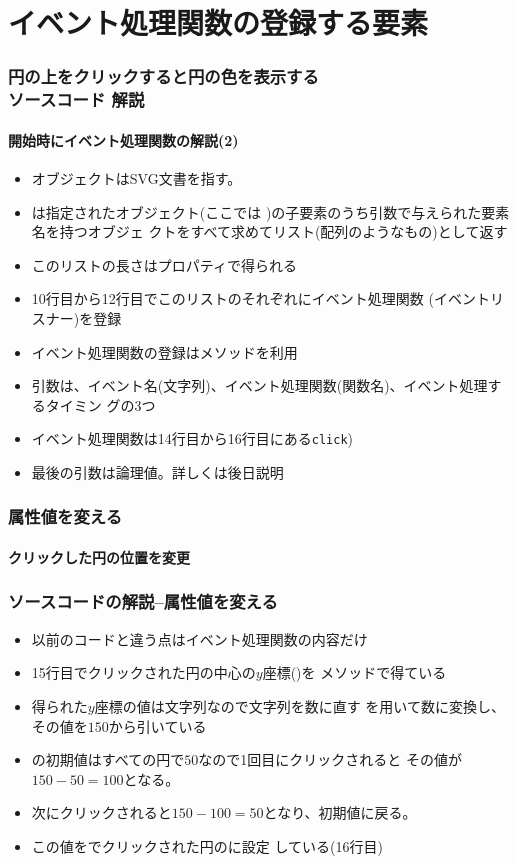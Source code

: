 \section{イベント処理関数の登録する要素}
\begin{frame}[containsverbatim]
 \frametitle{円の上をクリックすると円の色を表示する\\ソースコード
 解説}
  \framesubtitle{開始時にイベント処理関数の解説(2)}
\begin{itemize}
 \item {}オブジェクトはSVG文書を指す。
 \item {}は指定されたオブジェクト(ここでは
       )の子要素のうち引数で与えられた要素名を持つオブジェ
       クトをすべて求めてリスト(配列のようなもの)として返す
 \item このリストの長さはプロパティで得られる
 \item 10行目から12行目でこのリストのそれぞれにイベント処理関数
       (イベントリスナー)を登録
 \item イベント処理関数の登録はメソッドを利用
 \item 引数は、イベント名(文字列)、イベント処理関数(関数名)、イベント処理するタイミン
       グの3つ
 \item イベント処理関数は14行目から16行目にある\texttt{click})
 \item 最後の引数は論理値。詳しくは後日説明
\end{itemize}
\end{frame}
\begin{frame}[containsverbatim]
 \frametitle{属性値を変える}
 \framesubtitle{クリックした円の位置を変更}
\end{frame}
\begin{frame}[containsverbatim]
 \frametitle{ソースコードの解説--属性値を変える}
 \begin{itemize}
  \item 以前のコードと違う点はイベント処理関数の内容だけ
  \item 15行目でクリックされた円の中心の$y$座標()を
        メソッドで得ている
  \item 得られた$y$座標の値は文字列なので文字列を数に直す
        を用いて数に変換し、その値を$150$から引いている
  \item {}の初期値はすべての円で$50$なので1回目にクリックされると
        その値が$150-50=100$となる。
  \item 次にクリックされると$150-100=50$となり、初期値に戻る。
  \item この値をでクリックされた円のに設定
        している(16行目)
 \end{itemize}
\end{frame}
